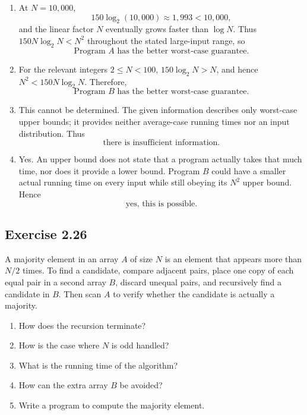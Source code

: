 \documentclass[12pt,a4paper]{article}
\begin{document}
\begin{enumerate}
  \renewcommand{\labelenumi}{\alph{enumi}.}

  \item At $N=10{,}000$,
  \[
  150\log_2(10{,}000)\approx1{,}993<10{,}000,
  \]
  and the linear factor $N$ eventually grows faster than $\log N$.
  Thus $150N\log_2N<N^2$ throughout the stated large-input range, so
  \[
  \boxed{\text{Program }A\text{ has the better worst-case guarantee.}}
  \]

  \item For the relevant integers $2\leq N<100$,
  $150\log_2N>N$, and hence $N^2<150N\log_2N$. Therefore,
  \[
  \boxed{\text{Program }B\text{ has the better worst-case guarantee.}}
  \]

  \item This cannot be determined. The given information describes
  only worst-case upper bounds; it provides neither average-case running
  times nor an input distribution. Thus
  \[
  \boxed{\text{there is insufficient information.}}
  \]

  \item Yes. An upper bound does not state that a program actually takes
  that much time, nor does it provide a lower bound. Program $B$ could
  have a smaller actual running time on every input while still obeying
  its $N^2$ upper bound. Hence
  \[
  \boxed{\text{yes, this is possible.}}
  \]
\end{enumerate}

\subsection*{\color{sectionnavy}Exercise 2.26}

\noindent
A majority element in an array $A$ of size $N$ is an element that
appears more than $N/2$ times. To find a candidate, compare adjacent
pairs, place one copy of each equal pair in a second array $B$, discard
unequal pairs, and recursively find a candidate in $B$. Then scan $A$
to verify whether the candidate is actually a majority.

\begin{enumerate}
  \renewcommand{\labelenumi}{\alph{enumi}.}
  \item How does the recursion terminate?
  \item How is the case where $N$ is odd handled?
  \item What is the running time of the algorithm?
  \item How can the extra array $B$ be avoided?
  \item Write a program to compute the majority element.
\end{enumerate}
\end{document}
